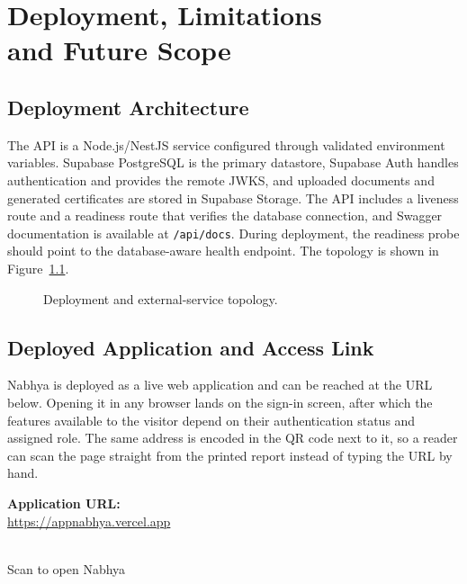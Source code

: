 \chapter[Deployment, Limitations and Future Scope]{Deployment, Limitations\\and Future Scope}
\label{ch:deployment}

\section{Deployment Architecture}
The API is a Node.js/NestJS service configured through validated environment variables. Supabase PostgreSQL is the primary datastore, Supabase Auth handles authentication and provides the remote JWKS, and uploaded documents and generated certificates are stored in Supabase Storage. The API includes a liveness route and a readiness route that verifies the database connection, and Swagger documentation is available at \texttt{/api/docs}. During deployment, the readiness probe should point to the database-aware health endpoint. The topology is shown in Figure~\ref{fig:deployment}.

\clearpage
\begin{figure}[H]
    \centering
    \caption{Deployment and external-service topology.}
    \label{fig:deployment}
\end{figure}

\clearpage
\section{Deployed Application and Access Link}
\label{sec:deployment-link}

Nabhya is deployed as a live web application and can be reached at the URL below. Opening it in any browser lands on the sign-in screen, after which the features available to the visitor depend on their authentication status and assigned role. The same address is encoded in the QR code next to it, so a reader can scan the page straight from the printed report instead of typing the URL by hand.

\begin{center}
\begin{minipage}[c]{0.58\textwidth}
\textbf{Application URL:}\\[0.08in]
\url{https://appnabhya.vercel.app}
\end{minipage}\hfill
\begin{minipage}[c]{0.34\textwidth}
\centering
{}\\[0.06in]
{\footnotesize Scan to open Nabhya}
\end{minipage}
\end{center}


